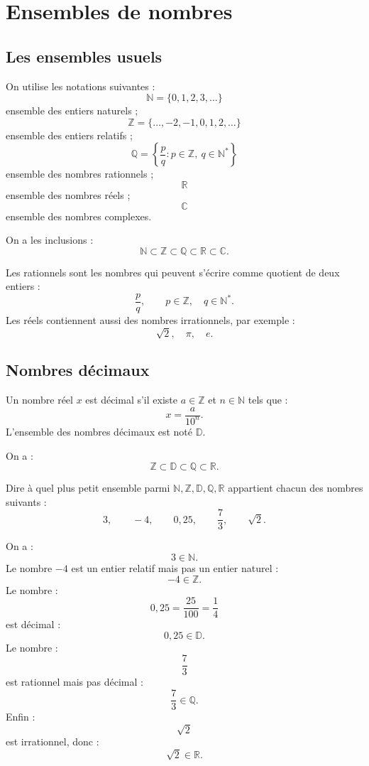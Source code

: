 \documentclass[11pt,a4paper]{article}
\newcommand{\N}{\mathbb N}
\newcommand{\Z}{\mathbb Z}
\newcommand{\D}{\mathbb D}
\newcommand{\Q}{\mathbb Q}
\newcommand{\R}{\mathbb R}
\newcommand{\C}{\mathbb C}
\begin{document}
\section{Ensembles de nombres}

\subsection{Les ensembles usuels}

\begin{definitionbox}
On utilise les notations suivantes :
\[
\N=\{0,1,2,3,\dots\}
\]
ensemble des entiers naturels ;
\[
\Z=\{\dots,-2,-1,0,1,2,\dots\}
\]
ensemble des entiers relatifs ;
\[
\Q=\left\{\frac pq : p\in\Z,\ q\in\N^*\right\}
\]
ensemble des nombres rationnels ;
\[
\R
\]
ensemble des nombres réels ;
\[
\C
\]
ensemble des nombres complexes.
\]
\end{definitionbox}

On a les inclusions :
\[
\N\subset\Z\subset\Q\subset\R\subset\C.
\]

\begin{retenirbox}
Les rationnels sont les nombres qui peuvent s'écrire comme quotient de deux entiers :
\[
\frac pq,\qquad p\in\Z,\quad q\in\N^*.
\]
Les réels contiennent aussi des nombres irrationnels, par exemple :
\[
\sqrt2,\quad \pi,\quad e.
\]
\end{retenirbox}

\subsection{Nombres décimaux}

\begin{definitionbox}
Un nombre réel \(x\) est décimal s'il existe \(a\in\Z\) et \(n\in\N\) tels que :
\[
x=\frac{a}{10^n}.
\]
L'ensemble des nombres décimaux est noté \(\D\).
\end{definitionbox}

On a :
\[
\Z\subset\D\subset\Q\subset\R.
\]

\begin{exercicebox}
Dire à quel plus petit ensemble parmi \(\N,\Z,\D,\Q,\R\) appartient chacun des nombres suivants :
\[
3,\qquad -4,\qquad 0,25,\qquad \frac{7}{3},\qquad \sqrt2.
\]
\end{exercicebox}

\begin{correctionbox}
On a :
\[
3\in\N.
\]
Le nombre \(-4\) est un entier relatif mais pas un entier naturel :
\[
-4\in\Z.
\]
Le nombre :
\[
0,25=\frac{25}{100}=\frac14
\]
est décimal :
\[
0,25\in\D.
\]
Le nombre :
\[
\frac73
\]
est rationnel mais pas décimal :
\[
\frac73\in\Q.
\]
Enfin :
\[
\sqrt2
\]
est irrationnel, donc :
\[
\sqrt2\in\R.
\]
\end{correctionbox}
\end{document}
